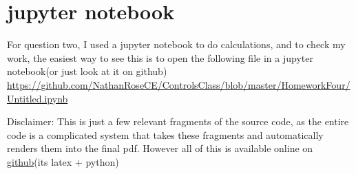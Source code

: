 \appendix

\vspace{2cm}

\section{jupyter notebook}
For question two, I used a jupyter notebook to do calculations, and to check my work, the easiest way to see this
is to open the following file in a jupyter notebook(or just look at it on github) \url{https://github.com/NathanRoseCE/ControlsClass/blob/master/HomeworkFour/Untitled.ipynb}

Disclaimer: This is just a few relevant fragments of the source code, as the entire code is a complicated system
that takes these fragments and automatically renders them into the final pdf. However all of this is available
online on \href{https://github.com/NathanRoseCE/ControlsClass}{github}(its latex + python)